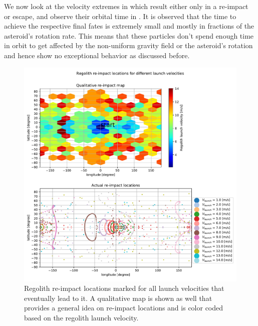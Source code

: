 %
\newline\newline
%
We now look at the velocity extremes in  which result either only in a re-impact or escape, and observe their orbital time in . It is observed that the time to achieve the respective final fates is extremely small and mostly in fractions of the asteroid's rotation rate. This means that these particles don't spend enough time in orbit to get affected by the non-uniform gravity field or the asteroid's rotation and hence show no exceptional behavior as discussed before.
\begin{figure}[htb]
\centering
\captionsetup{justification=centering}
\includegraphics[width=\textwidth, height=0.6\textheight, keepaspectratio=true]{Images/longest_edge_no_perturbations/crash_map_all_velocities.pdf}
\caption{Regolith re-impact locations marked for all launch velocities that eventually lead to it. A qualitative map is shown as well that provides a general idea on re-impact locations and is color coded based on the regolith launch velocity.}
\label{fig:crashmap_all_noSP}
\end{figure}
\FloatBarrier
